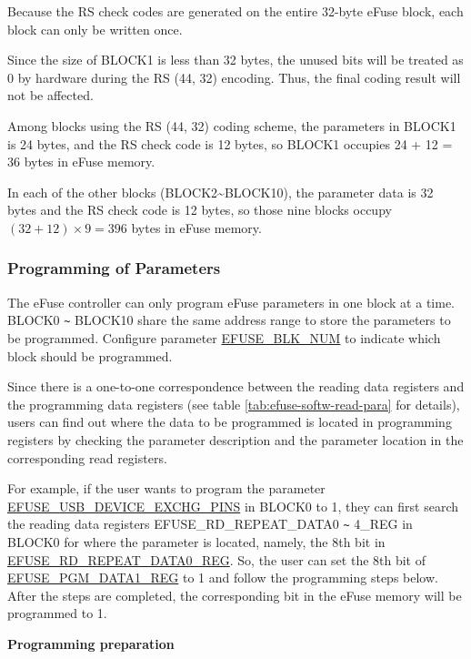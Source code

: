 \documentclass[main\_\_EN.tex]{subfiles}
\begin{document}
Because the RS check codes are generated on the entire 32-byte eFuse block, each block can only be written once.

Since the size of BLOCK1 is less than 32 bytes, the unused bits will be treated as 0 by hardware during the RS (44, 32) encoding. Thus, the final coding result will not be affected.

Among blocks using the RS (44, 32) coding scheme, the parameters in BLOCK1 is 24 bytes, and the RS check code is 12 bytes, so BLOCK1 occupies 24 + 12 = 36 bytes in eFuse memory.

In each of the other blocks (BLOCK2\textasciitilde BLOCK10), the parameter data is 32 bytes and the RS check code is 12 bytes, so those nine blocks occupy $(32 + 12) \times 9 = 396$ bytes in eFuse memory.

\subsubsection{Programming of Parameters}
\label{sec:efuse-software-programming-para}

The eFuse controller can only program eFuse parameters in one block at a time. BLOCK0 \verb+~+ BLOCK10 share the same address range to store the parameters to be programmed. Configure parameter \hyperref[fielddesc:EFUSEBLKNUM]{EFUSE\_BLK\_NUM} to indicate which block should be programmed.

Since there is a one-to-one correspondence between the reading data registers and the programming data registers (see table \ref{tab:efuse-softw-read-para} for details), users can find out where the data to be programmed is located in programming registers by checking the parameter description and the parameter location in the corresponding read registers.

For example, if the user wants to program the parameter \hyperref[fielddesc:EFUSEUSBDEVICEEXCHGPINS]{EFUSE\_USB\_DEVICE\_EXCHG\_PINS} in BLOCK0 to 1, they can first search the reading data registers EFUSE\_RD\_REPEAT\_DATA0 \verb+~+ 4\_REG in BLOCK0 for where the parameter is located, namely, the 8th bit in \hyperref[regdesc:EFUSERDREPEATDATA0REG]{EFUSE\_RD\_REPEAT\_DATA0\_REG}. So, the user can set the 8th bit of \hyperref[regdesc:EFUSEPGMDATANREG]{EFUSE\_PGM\_DATA1\_REG} 
to 1 and follow the programming steps below. After the steps are completed, the corresponding bit in the eFuse memory will be programmed to 1.

{\bfseries Programming preparation} 
\end{document}
